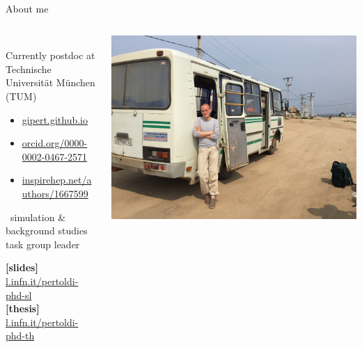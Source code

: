 \documentclass[10pt,aspectratio=169]{beamer}
\institute{Universit\`a degli Studi di Padova / INFN Padova}
\title{\mytitle}
\date{\place\ \sep\ \mydate}
\author{\people}
\begin{document}
\maketitle
\begin{frame}{About me}
  \begin{columns}
    \begin{column}{0.45\textwidth}\setlength{\parskip}{5pt}%
      \vspace*{1cm} \\
      Currently postdoc at Technische Universit\"at M\"unchen (TUM)
      \begin{itemize}
        \item \href{https://gipert.github.io}{gipert.github.io}
        \item \href{https://orcid.org/0000-0002-0467-2571}{orcid.org/0000-0002-0467-2571}
        \item \href{https://inspirehep.net/authors/1667599}{inspirehep.net/authors/1667599}
      \end{itemize}

      \gerda\ simulation \& background studies task group leader

      \vspace*{0.5cm}
      \footnotesize
      \textbf{[slides]} \href{https://l.infn.it/pertoldi-phd-sl}{l.infn.it/pertoldi-phd-sl} \\
      \textbf{[thesis]} \href{https://l.infn.it/pertoldi-phd-th}{l.infn.it/pertoldi-phd-th}
    \end{column}
    \begin{column}{0.55\textwidth}
      \vspace*{5mm}
      \includegraphics[trim=0 0 0 0,clip,width=\columnwidth]{me-siberia.jpg}
    \end{column}
  \end{columns}
\end{frame}
\end{document}
